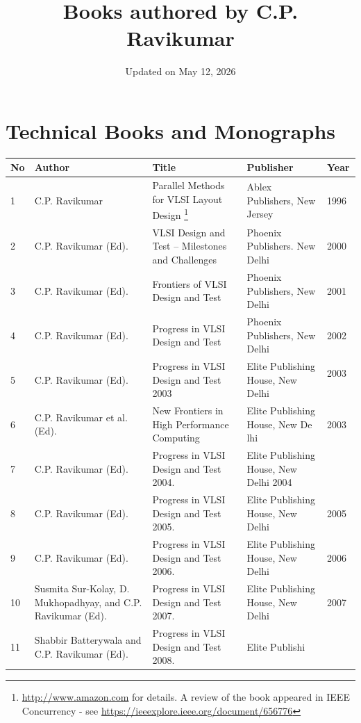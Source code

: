 \documentclass[onecolumn]{IEEEtran}
\title{Books authored by C.P. Ravikumar}
\author{Updated on May 12, 2026}
\begin{document}
\maketitle 

\section*{Technical Books and Monographs}

\begin{longtable}{|l| p{2cm} | p{5cm} | p{2cm}|p{1cm}|}
\hline
No & Author & Title   & Publisher     & Year \\
\hline
1        & 
C.P. Ravikumar  & 
Parallel Methods for VLSI Layout Design \footnote{ \url{http://www.amazon.com} for details. A review of the book appeared in IEEE Concurrency - see \url{https://ieeexplore.ieee.org/document/656776}  } & 
Ablex Publishers, New Jersey        & 
1996 \\ \hline
2       & C.P. Ravikumar (Ed). & VLSI Design and Test – Milestones and Challenges& Phoenix Publishers. New Delhi & 2000  \\ \hline
3       & C.P. Ravikumar (Ed). & Frontiers of VLSI Design and Test & Phoenix Publishers, New Delhi    & 2001\\ \hline
4       & C.P. Ravikumar (Ed). & Progress in VLSI Design and Test & Phoenix Publishers, New Delhi       & 2002\\ \hline
5       & C.P. Ravikumar (Ed). & Progress in VLSI Design and Test 2003 & Elite Publishing House, New Delhi      & 2003 \
\\ \hline
6       & C.P. Ravikumar et al. (Ed). & New Frontiers in High Performance Computing     & Elite Publishing House, New De
lhi     & 2003\\ \hline
7       & C.P. Ravikumar (Ed). & Progress in VLSI Design and Test 2004.         & Elite Publishing House, New Delhi
2004\\\hline
8       & C.P. Ravikumar (Ed). & Progress in VLSI Design and Test 2005.         & Elite Publishing House, New Delhi & 2005\\\hline
9       & C.P. Ravikumar (Ed). & Progress in VLSI Design and Test 2006.         & Elite Publishing House, New Delhi & 2006\\\hline
10      & Susmita Sur-Kolay, D. Mukhopadhyay, and C.P. Ravikumar (Ed). & Progress in VLSI Design and Test 2007.
& Elite Publishing House, New Delhi     & 2007\\\hline
11      & Shabbir Batterywala and C.P. Ravikumar (Ed). & Progress in VLSI Design and Test 2008.         & Elite Publishi

\end{longtable}
\end{document}
